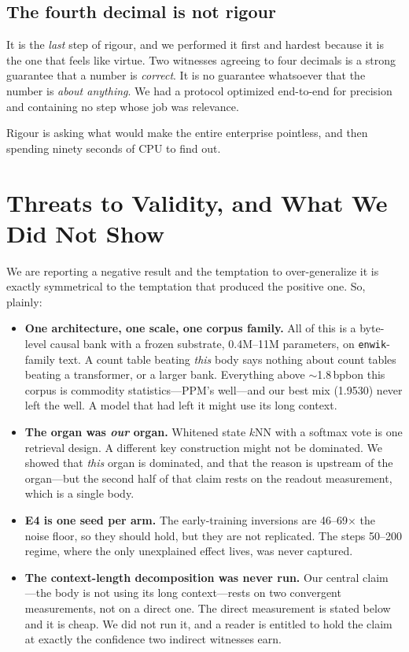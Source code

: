 \documentclass[11pt,a4paper]{article}
\newcommand{\bpb}{\,bpb}
\begin{document}
\subsection{The fourth decimal is not rigour}

It is the \emph{last} step of rigour, and we performed it first and hardest because
it is the one that feels like virtue. Two witnesses agreeing to four decimals is a
strong guarantee that a number is \emph{correct}. It is no guarantee whatsoever that
the number is \emph{about anything}. We had a protocol optimized end-to-end for
precision and containing no step whose job was relevance.

Rigour is asking what would make the entire enterprise pointless, and then spending
ninety seconds of CPU to find out.

\section{Threats to Validity, and What We Did Not Show}

We are reporting a negative result and the temptation to over-generalize it is
exactly symmetrical to the temptation that produced the positive one. So, plainly:

\begin{itemize}[leftmargin=1.5em,itemsep=3pt]
\item \textbf{One architecture, one scale, one corpus family.} All of this is a
byte-level causal bank with a frozen substrate, 0.4M--11M parameters, on
\texttt{enwik}-family text. A count table beating \emph{this} body says nothing
about count tables beating a transformer, or a larger bank. Everything above
$\sim$1.8\bpb on this corpus is commodity statistics---PPM's well---and our best mix
(1.9530) never left the well. A model that had left it might use its long context.
\item \textbf{The organ was \emph{our} organ.} Whitened state $k$NN with a softmax
vote is one retrieval design. A different key construction might not be dominated.
We showed that \emph{this} organ is dominated, and that the reason is upstream of
the organ---but the second half of that claim rests on the readout measurement,
which is a single body.
\item \textbf{E4 is one seed per arm.} The early-training inversions are
46--69$\times$ the noise floor, so they should hold, but they are not replicated.
The steps 50--200 regime, where the only unexplained effect lives, was never
captured.
\item \textbf{The context-length decomposition was never run.} Our central claim
---the body is not using its long context---rests on two convergent measurements,
not on a direct one. The direct measurement is stated below and it is cheap. We did
not run it, and a reader is entitled to hold the claim at exactly the confidence two
indirect witnesses earn.
\end{itemize}
\end{document}
